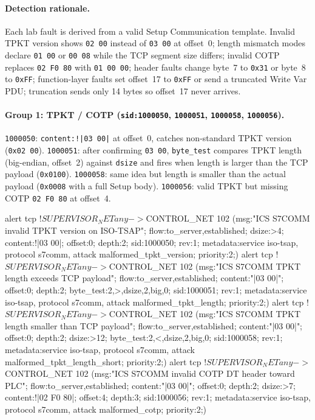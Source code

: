 \documentclass[../main.tex]{subfiles}
\begin{document}
\paragraph{Detection rationale.}
Each lab fault is derived from a valid Setup Communication template. Invalid TPKT version shows \texttt{02 00} instead of \texttt{03 00} at offset~0; length mismatch modes declare \texttt{01 00} or \texttt{00 08} while the TCP segment size differs; invalid COTP replaces \texttt{02 F0 80} with \texttt{01 00 00}; header faults change byte~7 to \texttt{0x31} or byte~8 to \texttt{0xFF}; function-layer faults set offset~17 to \texttt{0xFF} or send a truncated Write Var PDU; truncation sends only 14 bytes so offset~17 never arrives.

\paragraph{Group 1: TPKT / COTP (\texttt{sid:1000050}, \texttt{1000051}, \texttt{1000058}, \texttt{1000056}).}

\texttt{1000050}: \texttt{content:!|03 00|} at offset~0, catches non-standard TPKT version (\texttt{0x02 00}). \texttt{1000051}: after confirming \texttt{03 00}, \texttt{byte\_test} compares TPKT length (big-endian, offset~2) against \texttt{dsize} and fires when length is larger than the TCP payload (\texttt{0x0100}). \texttt{1000058}: same idea but length is smaller than the actual payload (\texttt{0x0008} with a full Setup body). \texttt{1000056}: valid TPKT but missing COTP \texttt{02 F0 80} at offset~4.

\begin{packetdump}
alert tcp !$SUPERVISOR_NET any -> $CONTROL_NET 102 (msg:"ICS S7COMM invalid TPKT version on ISO-TSAP";
  flow:to_server,established; dsize:>4; content:!|03 00|; offset:0; depth:2;
  sid:1000050; rev:1; metadata:service iso-tsap, protocol s7comm,
  attack malformed_tpkt_version; priority:2;)
alert tcp !$SUPERVISOR_NET any -> $CONTROL_NET 102 (msg:"ICS S7COMM TPKT length exceeds TCP payload";
  flow:to_server,established; content:"|03 00|"; offset:0; depth:2;
  byte_test:2,>,dsize,2,big,0; sid:1000051; rev:1;
  metadata:service iso-tsap, protocol s7comm, attack malformed_tpkt_length;
  priority:2;)
alert tcp !$SUPERVISOR_NET any -> $CONTROL_NET 102 (msg:"ICS S7COMM TPKT length smaller than TCP payload";
  flow:to_server,established; content:"|03 00|"; offset:0; depth:2; dsize:>12;
  byte_test:2,<,dsize,2,big,0; sid:1000058; rev:1;
  metadata:service iso-tsap, protocol s7comm, attack malformed_tpkt_length_short;
  priority:2;)
alert tcp !$SUPERVISOR_NET any -> $CONTROL_NET 102 (msg:"ICS S7COMM invalid COTP DT header toward PLC";
  flow:to_server,established; content:"|03 00|"; offset:0; depth:2; dsize:>7;
  content:!|02 F0 80|; offset:4; depth:3; sid:1000056; rev:1;
  metadata:service iso-tsap, protocol s7comm, attack malformed_cotp; priority:2;)
\end{packetdump}
\end{document}

